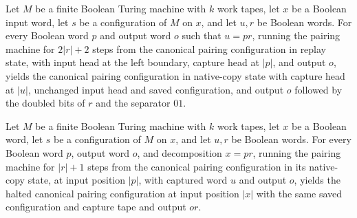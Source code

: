 \begin{lemma}
\label{Complexity.satPair_replay}
\leanok
{}
Let $M$ be a finite Boolean Turing machine with $k$ work tapes, let $x$ be a Boolean
input word, let $s$ be a configuration of $M$ on $x$, and let $u,r$ be Boolean words.
For every Boolean word $p$ and output word $o$ such that $u=pr$, running the pairing
machine for $2|r|+2$ steps from the canonical pairing configuration in replay state,
with input head at the left boundary, capture head at $|p|$, and output $o$, yields the
canonical pairing configuration in native-copy state with capture head at $|u|$,
unchanged input head and saved configuration, and output $o$ followed by the doubled
bits of $r$ and the separator $01$.
\end{lemma}

\begin{lemma}
\label{Complexity.satPair_copy}
\leanok
{}
Let $M$ be a finite Boolean Turing machine with $k$ work tapes, let $x$ be a Boolean
word, let $s$ be a configuration of $M$ on $x$, and let $u,r$ be Boolean words. For
every Boolean word $p$, output word $o$, and decomposition $x=p r$, running the pairing
machine for $|r|+1$ steps from the canonical pairing configuration in its native-copy
state, at input position $|p|$, with captured word $u$ and output $o$, yields the halted
canonical pairing configuration at input position $|x|$ with the same saved
configuration and capture tape and output $or$.
\end{lemma}

